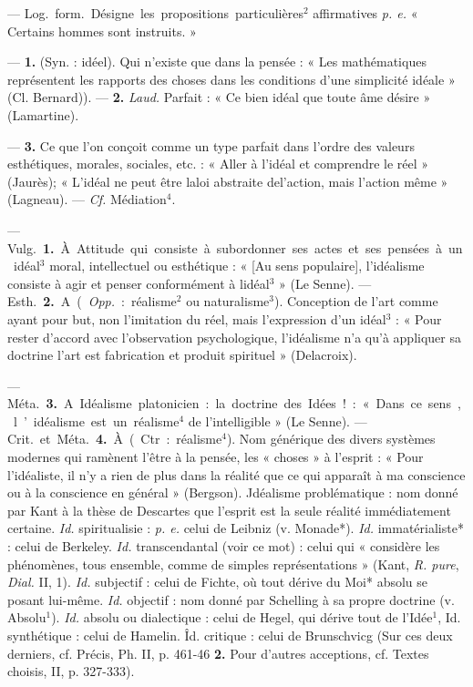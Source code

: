 
	\begin{itemize}[leftmargin=1cm, label=, itemsep=1pt]

 — \si{Log.} \si{form.} Désigne les propositions particulières$^2$ affirmatives
{\it p. e.} « Certains hommes sont instruits. »

 — {\bf 1.} (Syn. : idéel). Qui
n'existe que dans la pensée : « Les
mathématiques représentent les rapports des choses dans les conditions
d'une simplicité idéale » (Cl. Bernard)). — {\bf 2.} {\it Laud.} Parfait : « Ce bien
idéal que toute âme désire » (Lamartine).

 — {\bf 3.} Ce que l’on conçoit
comme un type parfait dans l’ordre
des valeurs esthétiques, morales, sociales, etc. : « Aller à l'idéal et comprendre le réel » (Jaurès); « L'idéal
ne peut être laloi abstraite del’action,
mais l’action même » (Lagneau). —
{\it {\it Cf.}} Médiation$^4$.

 — \si{Vulg.} {\bf 1.} À Attitude qui
consiste à subordonner ses actes et
ses pensées à un idéal$^3$ moral, intellectuel ou esthétique : « [Au sens
populaire], l’idéalisme consiste à
agir et penser conformément à
lidéal$^3$ » (Le Senne). — \si{Esth.} {\bf 2.} A
({\it Opp.} : réalisme$^2$ ou naturalisme$^3$).
Conception de l’art comme ayant
pour but, non l’imitation du réel,
mais l'expression d’un idéal$^3$ : « Pour
rester d'accord avec l'observation
psychologique, l’idéalisme n’a qu’à
appliquer sa doctrine l’art est
fabrication et produit spirituel »
(Delacroix).

— \si{Méta.} {\bf 3.} A. Idéalisme platonicien : la doctrine des Idées! :
« Dans ce sens, l’idéalisme est un
réalisme$^4$ de l’intelligible » (Le
Senne). — \si{Crit.} et \si{Méta.} {\bf 4.} À.
(Ctr. : réalisme$^4$). Nom générique
des divers systèmes modernes qui
ramènent l'être à la pensée, les
« choses » à l'esprit : « Pour l’idéaliste, il n’y a rien de plus dans la
réalité que ce qui apparaît à ma
conscience ou à la conscience en
général » (Bergson). Jdéalisme problématique : nom donné par Kant
à la thèse de Descartes que l'esprit
est la seule réalité immédiatement
certaine. {\it Id.} spiritualisie : {\it p. e.} celui
de Leibniz (v. Monade*). {\it Id.} immatérialiste* : celui de Berkeley. {\it Id.}
transcendantal (voir ce mot) : celui
qui « considère les phénomènes, tous
ensemble, comme de simples représentations » (Kant, {\it R. pure}, {\it Dial.}
II, 1). {\it Id.} subjectif : celui de Fichte,
où tout dérive du Moi* absolu se
posant lui-même. {\it Id.} objectif : nom
donné par Schelling à sa propre doctrine (v. Absolu$^1$). {\it Id.} absolu ou dialectique : celui de Hegel, qui dérive
tout de l’Idée$^1$, Id. synthétique : celui
de Hamelin. Îd. critique : celui de
Brunschvicg (Sur ces deux derniers,
cf. Précis, Ph. II, p. 461-46 {\bf 2.} Pour
d’autres acceptions, cf. Textes choisis, II, p. 327-333).


\end{itemize}
